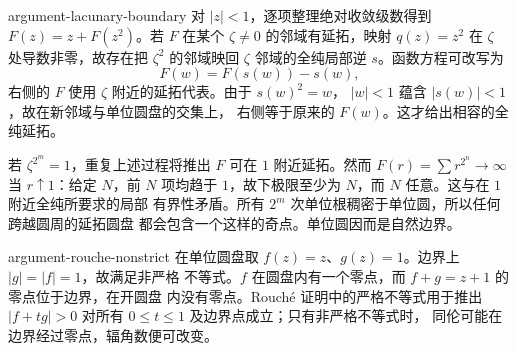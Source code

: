 \begin{solution}{argument-lacunary-boundary}
对 $|z|<1$，逐项整理绝对收敛级数得到
$F(z)=z+F(z^2)$。若 $F$ 在某个 $\zeta\ne0$ 的邻域有延拓，映射
$q(z)=z^2$ 在 $\zeta$ 处导数非零，故存在把 $\zeta^2$ 的邻域映回 $\zeta$
邻域的全纯局部逆 $s$。函数方程可改写为
\[
 F(w)=F(s(w))-s(w),
\]
右侧的 $F$ 使用 $\zeta$ 附近的延拓代表。由于 $s(w)^2=w$，
$|w|<1$ 蕴含 $|s(w)|<1$，故在新邻域与单位圆盘的交集上，
右侧等于原来的 $F(w)$。这才给出相容的全纯延拓。

若 $\zeta^{2^m}=1$，重复上述过程将推出 $F$ 可在 $1$ 附近延拓。然而
$F(r)=\sum r^{2^n}\to\infty$ 当 $r\uparrow1$：给定 $N$，前 $N$ 项均趋于
$1$，故下极限至少为 $N$，而 $N$ 任意。这与在 $1$ 附近全纯所要求的局部
有界性矛盾。所有 $2^m$ 次单位根稠密于单位圆，所以任何跨越圆周的延拓圆盘
都会包含一个这样的奇点。单位圆因而是自然边界。
\end{solution}

\begin{solution}{argument-rouche-nonstrict}
在单位圆盘取 $f(z)=z$、$g(z)=1$。边界上 $|g|=|f|=1$，故满足非严格
不等式。$f$ 在圆盘内有一个零点，而 $f+g=z+1$ 的零点位于边界，在开圆盘
内没有零点。Rouché 证明中的严格不等式用于推出
$|f+tg|>0$ 对所有 $0\le t\le1$ 及边界点成立；只有非严格不等式时，
同伦可能在边界经过零点，辐角数便可改变。
\end{solution}
